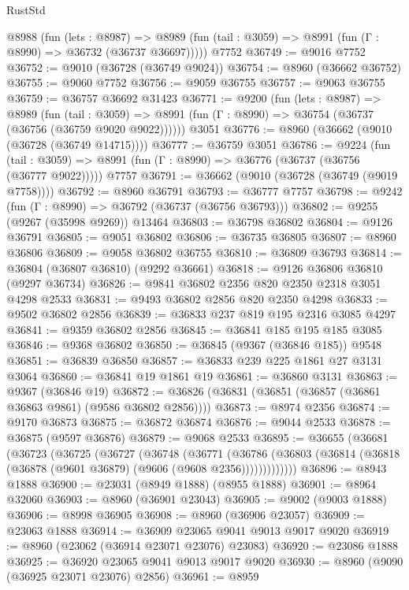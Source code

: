 \begin{lexlean}{RustStd}
\begin{coremodule}
    @8988
      (fun (lets : @8987) =>
      @8989 (fun (tail : @3059) => @8991 (fun (Γ : @8990) => @36732 (@36737 @36697)))))
    @7752
@36749 := @9016 @7752
@36752 := @9010 (@36728 (@36749 @9024))
@36754 := @8960 (@36662 @36752)
@36755 := @9060 @7752
@36756 := @9059 @36755
@36757 := @9063 @36755
@36759 := @36757 @36692 @31423
@36771 := @9200
    (fun (lets : @8987) =>
    @8989
      (fun (tail : @3059) =>
      @8991 (fun (Γ : @8990) => @36754 (@36737 (@36756 (@36759 @9020 @9022))))))
    @3051
@36776 := @8960 (@36662 (@9010 (@36728 (@36749 @14715))))
@36777 := @36759 @3051
@36786 := @9224
    (fun (tail : @3059) => @8991 (fun (Γ : @8990) => @36776 (@36737 (@36756 (@36777 @9022)))))
    @7757
@36791 := @36662 (@9010 (@36728 (@36749 (@9019 @7758))))
@36792 := @8960 @36791
@36793 := @36777 @7757
@36798 := @9242 (fun (Γ : @8990) => @36792 (@36737 (@36756 @36793)))
@36802 := @9255 (@9267 (@35998 @9269)) @13464
@36803 := @36798 @36802
@36804 := @9126 @36791
@36805 := @9051 @36802
@36806 := @36735 @36805
@36807 := @8960 @36806
@36809 := @9058 @36802 @36755
@36810 := @36809 @36793
@36814 := @36804 (@36807 @36810) (@9292 @36661)
@36818 := @9126 @36806 @36810 (@9297 @36734)
@36826 := @9841 @36802 @2356 @820 @2350 @2318 @3051 @4298 @2533
@36831 := @9493 @36802 @2856 @820 @2350 @4298
@36833 := @9502 @36802 @2856
@36839 := @36833 @237 @819 @195 @2316 @3085 @4297
@36841 := @9359 @36802 @2856
@36845 := @36841 @185 @195 @185 @3085
@36846 := @9368 @36802
@36850 := @36845 (@9367 (@36846 @185)) @9548
@36851 := @36839 @36850
@36857 := @36833 @239 @225 @1861 @27 @3131 @3064
@36860 := @36841 @19 @1861 @19
@36861 := @36860 @3131
@36863 := @9367 (@36846 @19)
@36872 := @36826 (@36831 (@36851 (@36857 (@36861 @36863 @9861) (@9586 @36802 @2856))))
@36873 := @8974 @2356
@36874 := @9170 @36873
@36875 := @36872 @36874
@36876 := @9044 @2533
@36878 := @36875 (@9597 @36876)
@36879 := @9068 @2533
@36895 := @36655
    (@36681
      (@36723
        (@36725
          (@36727
            (@36748
              (@36771
                (@36786
                  (@36803 (@36814 (@36818 (@36878 (@9601 @36879) (@9606 (@9608 @2356)))))))))))))
@36896 := @8943 @1888
@36900 := @23031 (@8949 @1888) (@8955 @1888)
@36901 := @8964 @32060
@36903 := @8960 (@36901 @23043)
@36905 := @9002 (@9003 @1888)
@36906 := @8998 @36905
@36908 := @8960 (@36906 @23057)
@36909 := @23063 @1888
@36914 := @36909 @23065 @9041 @9013 @9017 @9020
@36919 := @8960 (@23062 (@36914 @23071 @23076) @23083)
@36920 := @23086 @1888
@36925 := @36920 @23065 @9041 @9013 @9017 @9020
@36930 := @8960 (@9090 (@36925 @23071 @23076) @2856)
@36961 := @8959

\end{coremodule}
\end{lexlean}

